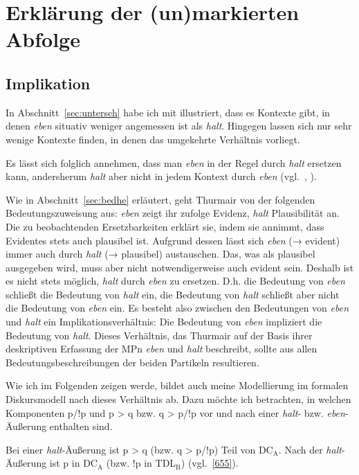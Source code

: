 \section{Erklärung der (un)markierten Abfolge}
\label{sec:erklärunghe}
\subsection{Implikation}
\label{sec:impli}
In Abschnitt~\ref{sec:untersch} habe ich mit \citet{Thurmair1989} illustriert, dass es Kontexte gibt, in denen \textit{eben} situativ weniger angemessen ist als \textit{halt}. Hingegen lassen sich nur sehr wenige Kontexte finden, in denen das umgekehrte Verhältnis vorliegt. 

Es lässt sich folglich annehmen, dass man \textit{eben} in der Regel durch \textit{halt} ersetzen kann, andersherum \textit{halt} aber nicht in jedem Kontext durch \textit{eben} (vgl.\ \citealt[128]{Thurmair1989}, \citealt[392]{Ickler1994}).

Wie in Abschnitt~\ref{sec:bedhe} erläutert, geht Thurmair von der folgenden Bedeutungszuweisung aus: \textit{eben} zeigt ihr zufolge Evidenz, \textit{halt} Plausibilität an. Die zu beobachtenden Ersetzbarkeiten erklärt sie, indem sie annimmt, dass Evidentes stets auch plausibel ist. Aufgrund dessen lässt sich \textit{eben} (→ evident) immer auch durch \textit{halt} (→ plausibel) austauschen. Das, was als plausibel ausgegeben wird, muss aber nicht notwendigerweise auch evident sein. Deshalb ist es nicht stets möglich, \textit{halt} durch \textit{eben} zu ersetzen. D.h. die Bedeutung von \textit{eben} schließt die Bedeutung von \textit{halt} ein, die Bedeutung von \textit{halt} schließt aber nicht die Bedeutung von \textit{eben} ein. Es besteht also zwischen den  Bedeutungen von \textit{eben} und \textit{halt} ein Im\-plikationsverhältnis: Die Bedeutung von \textit{eben} impliziert die Bedeutung von \textit{halt}. Dieses Verhältnis, das Thurmair auf der Basis ihrer deskriptiven Erfassung der MPn \textit{eben} und \textit{halt} beschreibt, sollte aus allen Bedeutungsbeschreibungen der beiden Partikeln resultieren. 

Wie ich im Folgenden zeigen werde, bildet auch meine Modellierung im formalen Diskursmodell nach \citet{Farkas2010} dieses Verhältnis ab. Dazu möchte ich betrachten, in welchen Komponenten p/!p und p > q bzw. q > p/!p vor und nach einer \textit{halt}- bzw. \textit{eben}-Äußerung enthalten sind.  

Bei einer \textit{halt}-Äußerung ist p > q (bzw. q > p/!p) Teil von DC$_{\textrm{A}}$. Nach der \textit{halt}-Äußerung ist p in DC$_{\textrm{A}}$ (bzw. !p in TDL$_{\textrm{B}}$) (vgl.\ \ref{655}).

